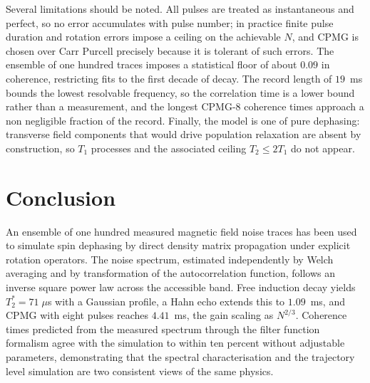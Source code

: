 \documentclass[conference]{IEEEtran}
\begin{document}
Several limitations should be noted. All pulses are treated as instantaneous and
perfect, so no error accumulates with pulse number; in practice finite pulse
duration and rotation errors impose a ceiling on the achievable $N$, and CPMG is
chosen over Carr Purcell precisely because it is tolerant of such errors. The
ensemble of one hundred traces imposes a statistical floor of about $0.09$ in
coherence, restricting fits to the first decade of decay. The record length of
$19$~ms bounds the lowest resolvable frequency, so the correlation time is a lower
bound rather than a measurement, and the longest CPMG-8 coherence times approach a
non negligible fraction of the record. Finally, the model is one of pure dephasing:
transverse field components that would drive population relaxation are absent by
construction, so $T_1$ processes and the associated ceiling $T_2 \le 2T_1$ do not
appear.

\section{Conclusion}

An ensemble of one hundred measured magnetic field noise traces has been used to
simulate spin dephasing by direct density matrix propagation under explicit
rotation operators. The noise spectrum, estimated independently by Welch averaging
and by transformation of the autocorrelation function, follows an inverse square
power law across the accessible band. Free induction decay yields
$T_2^{*} = 71\;\mu$s with a Gaussian profile, a Hahn echo extends this to
$1.09$~ms, and CPMG with eight pulses reaches $4.41$~ms, the gain scaling as
$N^{2/3}$. Coherence times predicted from the measured spectrum through the filter
function formalism agree with the simulation to within ten percent without
adjustable parameters, demonstrating that the spectral characterisation and the
trajectory level simulation are two consistent views of the same physics.
\end{document}
